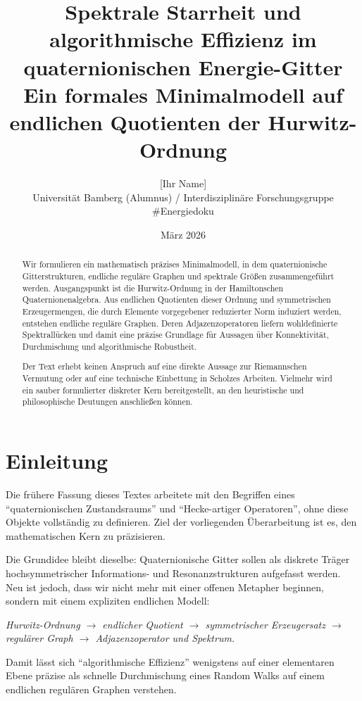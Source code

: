 \documentclass[12pt,a4paper]{article}
\title{\textbf{Spektrale Starrheit und algorithmische Effizienz im quaternionischen Energie-Gitter}\\
	\large Ein formales Minimalmodell auf endlichen Quotienten der Hurwitz-Ordnung}
\author{[Ihr Name] \\ \small Universität Bamberg (Alumnus) / Interdisziplinäre Forschungsgruppe \#Energiedoku}
\date{März 2026}
\theoremstyle{definition}
\begin{document}
	\maketitle
	
	\begin{abstract}
		Wir formulieren ein mathematisch präzises Minimalmodell, in dem quaternionische Gitterstrukturen, endliche reguläre Graphen und spektrale Größen zusammengeführt werden. Ausgangspunkt ist die Hurwitz-Ordnung in der Hamiltonschen Quaternionenalgebra. Aus endlichen Quotienten dieser Ordnung und symmetrischen Erzeugermengen, die durch Elemente vorgegebener reduzierter Norm induziert werden, entstehen endliche reguläre Graphen. Deren Adjazenzoperatoren liefern wohldefinierte Spektrallücken und damit eine präzise Grundlage für Aussagen über Konnektivität, Durchmischung und algorithmische Robustheit.
		
		Der Text erhebt keinen Anspruch auf eine direkte Aussage zur Riemannschen Vermutung oder auf eine technische Einbettung in Scholzes Arbeiten. Vielmehr wird ein sauber formulierter diskreter Kern bereitgestellt, an den heuristische und philosophische Deutungen anschließen können.
	\end{abstract}
	
	\section{Einleitung}
	
	Die frühere Fassung dieses Textes arbeitete mit den Begriffen eines ``quaternionischen Zustandsraums'' und ``Hecke-artiger Operatoren'', ohne diese Objekte vollständig zu definieren. Ziel der vorliegenden Überarbeitung ist es, den mathematischen Kern zu präzisieren.
	
	Die Grundidee bleibt dieselbe: Quaternionische Gitter sollen als diskrete Träger hochsymmetrischer Informations- und Resonanzstrukturen aufgefasst werden. Neu ist jedoch, dass wir nicht mehr mit einer offenen Metapher beginnen, sondern mit einem expliziten endlichen Modell:
	
	\begin{center}
		\emph{Hurwitz-Ordnung \(\longrightarrow\) endlicher Quotient \(\longrightarrow\) symmetrischer Erzeugersatz \(\longrightarrow\) regulärer Graph \(\longrightarrow\) Adjazenzoperator und Spektrum.}
	\end{center}
	
	Damit lässt sich ``algorithmische Effizienz'' wenigstens auf einer elementaren Ebene präzise als schnelle Durchmischung eines Random Walks auf einem endlichen regulären Graphen verstehen.
	
\end{document}
